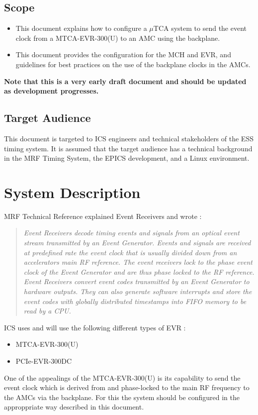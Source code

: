 \documentclass[11pt
  , a4paper
  , article
  , oneside
  , showtrims
]{memoir}
\begin{document}
\section{Scope}
\begin{itemize}
\item This document explains how to configure a $\mu$TCA system to send the event clock from a MTCA-EVR-300(U) to an AMC using the backplane.
\item This document provides the configuration for the MCH and EVR, and guidelines for best practices on the use of the backplane clocks in the AMCs.
\end{itemize}
\textbf{Note that this is a very early draft document and should be updated as development progresses.}

\section{Target Audience}
This document is targeted to ICS engineers and technical stakeholders of the ESS timing system. It is assumed that the target audience has a technical background in the MRF Timing System, the EPICS development, and a Linux environment.


\chapter{System Description}
MRF Technical Reference \citep[see][p45]{MRFEVENTSYSTEMDC} explained Event Receivers and wrote :
\blockquote{\textit{Event Receivers decode timing events and signals from an optical event stream transmitted by an Event Generator. Events and signals are received at predefined rate the event clock that is usually divided down from an accelerators main RF reference. The event receivers lock to the phase event clock of the Event Generator and are thus phase locked to the RF reference. Event Receivers convert event codes transmitted by an Event Generator to hardware outputs. They can also generate software interrupts and store the event codes with globally distributed timestamps into FIFO memory to be read by a CPU.}}

ICS uses and will use the following different types of EVR :
\begin{itemize}
\item MTCA-EVR-300(U)
\item PCIe-EVR-300DC
\end{itemize}

One of the appealings of the MTCA-EVR-300(U) is its capability to send the event clock which is derived from and phase-locked to the main RF frequency to the AMCs via the backplane. For this the system should be configured in the approppriate way described in this document.
\end{document}
